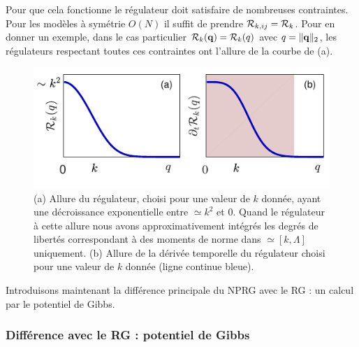 \documentclass[10.5pt]{article}
\begin{document}
\begin{multicols*}{2}
Pour que cela fonctionne le régulateur doit satisfaire de nombreuses contraintes. Pour les modèles à symétrie $O(N)$ il suffit de prendre $\mathcal{R}_{k,ij} = \mathcal{R}_k$. Pour en donner un exemple, dans le cas particulier $\mathcal{R}_k({\bf q}) = \mathcal{R}_k(q)$ avec $q = \|{\bf q}\|_2$, les régulateurs respectant toutes ces contraintes ont l'allure de la courbe de   (a).\\
\begin{figure}[H]
\begin{center}
	\includegraphics[width=0.95\columnwidth]{RegDerReg.pdf}
\end{center}
\vspace*{-22pt}
\caption{(a) Allure du régulateur, choisi pour une valeur de $k$ donnée, ayant une décroissance exponentielle entre $\simeq k^2$ et $0$. Quand le régulateur à cette allure nous avons approximativement intégrés les degrés de libertés correspondant à des moments de norme dans $\simeq [k,\Lambda]$ uniquement. (b) Allure de la dérivée temporelle du régulateur choisi pour une valeur de $k$ donnée (ligne continue bleue).}
\label{fig:RegDerReg}
\end{figure}
Introduisons maintenant la différence principale du NPRG avec le RG : un calcul par le potentiel de Gibbs.


\subsubsection{Différence avec le RG : potentiel de Gibbs}


\end{multicols*}
\end{document}
